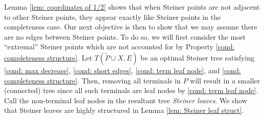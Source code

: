 \documentclass{theoretics}
\newcommand{\1}{\textbf{1}}
\renewcommand{\tilde}{\widetilde}
\begin{document}
Lemma \ref{lem: coordinates of 1/2} shows that when Steiner points are not adjacent to other Steiner points, they appear exactly like Steiner points in the completeness case. Our next objective is then to show that we may assume there are no edges between Steiner points. To do so, we will first consider the most ``extremal'' Steiner points which are not accounted for by Property \ref{cond: completeness structure}. Let $T(\tilde{P} \cup X, E)$ be an optimal Steiner tree satisfying \ref{cond: max decrease}, \ref{cond: short edges}, \ref{cond: term leaf node}, and \ref{cond: completeness structure}. Then, removing all terminals in $P$ will result in a smaller (connected) tree since all such terminals are leaf nodes by \ref{cond: term leaf node}. Call the non-terminal leaf nodes in the resultant tree \textit{Steiner leaves}. We show that Steiner leaves are highly structured in Lemma \ref{lem: Steiner leaf struct}.
\end{document}
